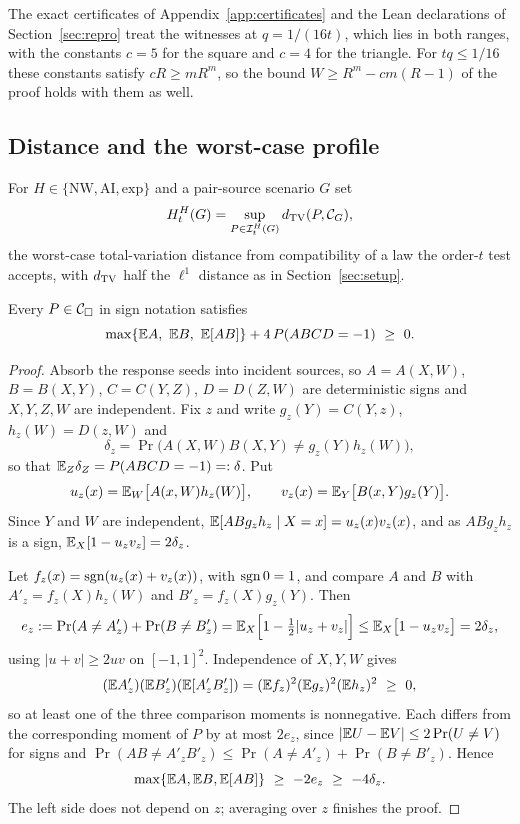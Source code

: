 The exact certificates of Appendix~\ref{app:certificates} and the Lean declarations of Section~\ref{sec:repro} treat the witnesses at $q=1/(16t)$, which lies in both ranges, with the constants $c=5$ for the square and $c=4$ for the triangle. For $tq\le1/16$ these constants satisfy $cR\ge mR^m$, so the bound $W\ge R^m-cm(R-1)$ of the proof holds with them as well.

\subsection{Distance and the worst-case profile}\label{sec:worstcase}

For $H\in\{\mathrm{NW},\mathrm{AI},\mathrm{exp}\}$ and a pair-source scenario $G$ set
\begin{equation}\label{eq:Hprofile}
H^H_t(G)=\sup_{P\in\mathcal I^H_t(G)}d_{\operatorname{TV}}(P,\mathcal C_{G}),
\end{equation}
the worst-case total-variation distance from compatibility of a law the order-$t$ test accepts, with $d_{\operatorname{TV}}$ half the $\ell^1$ distance as in Section~\ref{sec:setup}.

\begin{lemma}\label{lem:maxmoment}
Every $P\in\mathcal C_{\square}$ in sign notation satisfies
\[
\max\{\E A,\ \E B,\ \E[AB]\}+4\,P(ABCD=-1)\ \ge\ 0 .
\]
\end{lemma}

\begin{proof}
Absorb the response seeds into incident sources, so $A=A(X,W)$, $B=B(X,Y)$, $C=C(Y,Z)$, $D=D(Z,W)$ are deterministic signs and $X,Y,Z,W$ are independent. Fix $z$ and write $g_z(Y)=C(Y,z)$, $h_z(W)=D(z,W)$ and
\[
\delta_z=\Pr\bigl(A(X,W)B(X,Y)\ne g_z(Y)h_z(W)\bigr),
\]
so that $\mathbb E_Z\delta_Z=P(ABCD=-1)=:\delta$. Put
\[
u_z(x)=\mathbb E_W\bigl[A(x,W)h_z(W)\bigr],\qquad v_z(x)=\mathbb E_Y\bigl[B(x,Y)g_z(Y)\bigr].
\]
Since $Y$ and $W$ are independent, $\mathbb E[ABg_zh_z\mid X=x]=u_z(x)v_z(x)$, and as $ABg_zh_z$ is a sign, $\mathbb E_X[1-u_zv_z]=2\delta_z$.

Let $f_z(x)=\operatorname{sgn}(u_z(x)+v_z(x))$, with $\operatorname{sgn}0=1$, and compare $A$ and $B$ with $A'_z=f_z(X)h_z(W)$ and $B'_z=f_z(X)g_z(Y)$. Then
\[
e_z:=\Pr(A\ne A'_z)+\Pr(B\ne B'_z)=\mathbb E_X\Bigl[1-\tfrac12|u_z+v_z|\Bigr]\le\mathbb E_X\bigl[1-u_zv_z\bigr]=2\delta_z,
\]
using $|u+v|\ge2uv$ on $[-1,1]^2$. Independence of $X,Y,W$ gives
\[
(\mathbb E A'_z)(\mathbb E B'_z)(\mathbb E[A'_zB'_z])=(\mathbb E f_z)^2(\mathbb E g_z)^2(\mathbb E h_z)^2\ \ge\ 0,
\]
so at least one of the three comparison moments is nonnegative. Each differs from the corresponding moment of $P$ by at most $2e_z$, since $|\mathbb E U-\mathbb E V|\le2\Pr(U\ne V)$ for signs and $\Pr(AB\ne A'_zB'_z)\le\Pr(A\ne A'_z)+\Pr(B\ne B'_z)$. Hence
\[
\max\{\E A,\E B,\E[AB]\}\ \ge\ -2e_z\ \ge\ -4\delta_z .
\]
The left side does not depend on $z$; averaging over $z$ finishes the proof.
\end{proof}

